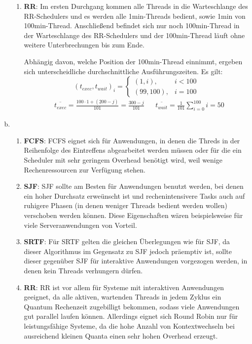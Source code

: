\documentclass[numbers=noendperiod,10pt]{scrartcl}
\begin{document}
\begin{enumerate}[a)]
\begin{enumerate}
		\item \textbf{RR}: Im ersten Durchgang kommen alle Threads in die Warteschlange des RR-Schedulers und es werden alle 1min-Threads bedient, sowie 1min von 100min-Thread. Anschließend befindet sich nur noch 100min-Thread in der Warteschlange des RR-Schedulers und der 100min-Thread läuft ohne weitere Unterbrechungen bis zum Ende.
		
		Abhängig davon, welche Position der 100min-Thread einnimmt, ergeben sich unterscheidliche durchschnittliche Ausführungszeiten. Es gilt:
		\begin{equation}
			(t_{exec},t_{wait})_i = \begin{cases}
			(1,i), &i<100\\
			(99,100), &i=100
			\end{cases}
		\end{equation}
		\begin{align}
			&\overline{t_{exec}} = \frac{100\cdot 1 + (200-j)}{101} = \frac{300-j}{101} &&\overline{t_{wait}} = \frac{1}{101}\sum_{i=0}^{100}i = 50
		\end{align}
		
	\end{enumerate}

	\item \begin{enumerate}
		\item \textbf{FCFS}: FCFS eignet sich für Anwendungen, in denen die Threds in der Reihenfolge des Eintreffens abgearbeitet werden müssen oder für die ein Scheduler mit sehr geringem Overhead benötigt wird, weil wenige Rechenressourcen zur Verfügung stehen.
		
		\item \textbf{SJF}: SJF sollte am Besten für Anwendungen benutzt werden, bei denen ein hoher Durchsatz erweünscht ist und rechenintensivere Tasks auch auf ruhigere Phasen (in denen weniger Threads bedient werden wollen) verschoben werden können. Diese Eigenschaften wären beispielsweise für viele Serveranwendungen von Vorteil.
		
		\item \textbf{SRTF}: Für SRTF gelten die gleichen Überlegungen wie für SJF, da dieser Algorithmus im Gegensatz zu SJF jedoch präemptiv ist, sollte dieser gegenüber SJF für interaktive Anwendungen vorgezogen werden, in denen kein Threads verhungern dürfen.
		
		\item \textbf{RR}: RR ist vor allem für Systeme mit interaktiven Anwendungen geeignet, da alle aktiven, wartenden Threads in jedem Zyklus ein Quantum Rechenzeit zugebilligt bekommen, sodass viele Anwendungen gut parallel laufen können. Allerdings eignet sich Round Robin nur für leistungsfähige Systeme, da die hohe Anzahl von Kontextwechseln bei ausreichend kleinen Quanta einen sehr hohen Overhead erzeugt.
	\end{enumerate}
\end{enumerate}
\end{document}
